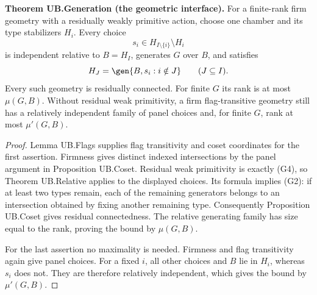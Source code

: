 \noindent\textbf{Theorem UB.Generation (the geometric interface).}
For a finite-rank firm geometry with a residually weakly primitive action,
choose one chamber and its type stabilizers $H_i$. Every choice
\[
 s_i\in H_{I\setminus\{i\}}\setminus H_i
\]
is independent relative to $B=H_I$, generates $G$ over $B$, and satisfies
\[
 H_J=\gen{B,s_i:i\notin J}\qquad(J\subseteq I).
\]
Every such geometry is residually connected. For finite $G$ its rank is
at most $\mu(G,B)$. Without residual weak primitivity, a firm
flag-transitive geometry still has a relatively independent family of
panel choices and, for finite $G$, rank at most $\mu'(G,B)$.
\begin{proof}
Lemma UB.Flags supplies flag transitivity and coset coordinates for the
first assertion. Firmness gives distinct indexed intersections by the
panel argument in Proposition UB.Coset. Residual weak primitivity is
exactly (G4), so Theorem UB.Relative applies to the displayed choices.
Its formula implies (G2): if at least two types remain, each of the
remaining generators belongs to an intersection obtained by fixing
another remaining type. Consequently Proposition UB.Coset gives residual
connectedness. The relative generating family has size equal to the
rank, proving the bound by $\mu(G,B)$.

For the last assertion no maximality is needed. Firmness and flag
transitivity again give panel choices. For a fixed $i$, all other choices
and $B$ lie in $H_i$, whereas $s_i$ does not. They are therefore relatively
independent, which gives the bound by $\mu'(G,B)$.
\end{proof}
